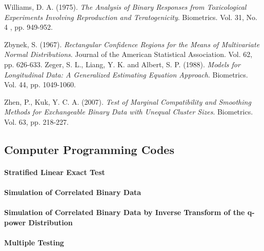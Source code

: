 \documentclass[12pt,oneside]{report}
\theoremstyle{definition}
\theoremstyle{mystyle}
\begin{document}
\begin{thebibliography}{99}
Williams, D. A. (1975). \emph{ The Analysis of Binary Responses from Toxicological Experiments Involving Reproduction and Teratogenicity}.  Biometrics.  Vol. 31, No. 4 , pp. 949-952.



Zbynek, S. (1967). \emph{Rectangular Confidence Regions for the Means of Multivariate Normal Distributions}. Journal of the American Statistical Association.  Vol. 62, pp. 626-633.
Zeger, S. L., Liang, Y. K. and  Albert, S. P. (1988). \emph{Models for Longitudinal Data: A Generalized Estimating Equation Approach}. Biometrics. Vol. 44, pp. 1049-1060.

Zhen, P.,  Kuk, Y. C. A. (2007). \emph{Test of Marginal Compatibility and Smoothing Methods for Exchangeable Binary Data with Unequal Cluster Sizes}.  Biometrics. Vol. 63, pp. 218-227.


\end{thebibliography}

\begin{appendices}
\chapter{Computer Programming Codes}

\subsubsection{Stratified Linear Exact Test}





\subsubsection{Simulation of Correlated Binary Data}



\subsubsection{Simulation of Correlated Binary Data by Inverse Transform of the q-power Distribution}



\subsubsection{Multiple Testing }


\end{appendices}
\end{document}
